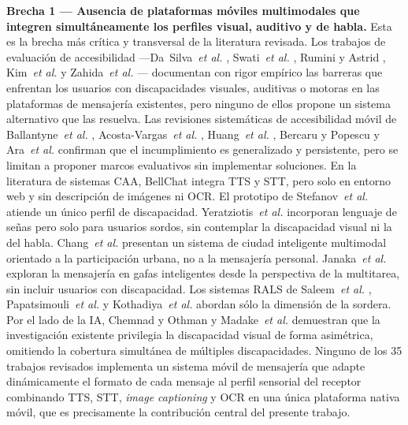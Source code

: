 \documentclass[journal]{IEEEtran}
\begin{document}
			\textbf{Brecha 1 --- Ausencia de plataformas m\'oviles multimodales que integren simult\'aneamente los perfiles visual, auditivo y de habla.} Esta es la brecha m\'as cr\'itica y transversal de la literatura revisada. Los trabajos de evaluaci\'on de accesibilidad ---Da~Silva~\textit{et al.} \cite{dasilva2016}, Swati~\textit{et al.} \cite{swati2021}, Rumini y Astrid \cite{rumini2019}, Kim~\textit{et al.} \cite{kim2024} y Zahida~\textit{et al.} \cite{zahida2021}--- documentan con rigor emp\'irico las barreras que enfrentan los usuarios con discapacidades visuales, auditivas o motoras en las plataformas de mensajer\'ia existentes, pero ninguno de ellos propone un sistema alternativo que las resuelva. Las revisiones sistem\'aticas de accesibilidad m\'ovil de Ballantyne~\textit{et al.} \cite{ballantyne2018}, Acosta-Vargas~\textit{et al.} \cite{acosta2021}, Huang~\textit{et al.} \cite{huang2025}, Bercaru y Popescu \cite{bercaru2024} y Ara~\textit{et al.} \cite{ara2024} confirman que el incumplimiento es generalizado y persistente, pero se limitan a proponer marcos evaluativos sin implementar soluciones. En la literatura de sistemas CAA, BellChat \cite{guerrero2021bellchat} integra TTS y STT, pero solo en entorno web y sin descripci\'on de im\'agenes ni OCR. El prototipo de Stefanov~\textit{et al.} \cite{stefanov2024} atiende un \'unico perfil de discapacidad. Yeratziotis~\textit{et al.} \cite{yeratziotis2023} incorporan lenguaje de se\~nas pero solo para usuarios sordos, sin contemplar la discapacidad visual ni la del habla. Chang~\textit{et al.} \cite{chang2022} presentan un sistema de ciudad inteligente multimodal orientado a la participaci\'on urbana, no a la mensajer\'ia personal. Janaka~\textit{et al.} \cite{janaka2023} exploran la mensajer\'ia en gafas inteligentes desde la perspectiva de la multitarea, sin incluir usuarios con discapacidad. Los sistemas RALS de Saleem~\textit{et al.} \cite{saleem2023}, Papatsimouli~\textit{et al.} \cite{papatsimouli2023} y Kothadiya~\textit{et al.} \cite{kothadiya2022} abordan s\'olo la dimensi\'on de la sordera. Por el lado de la IA, Chemnad y Othman \cite{chemnad2024} y Madake~\textit{et al.} \cite{madake2023} demuestran que la investigaci\'on existente privilegia la discapacidad visual de forma asim\'etrica, omitiendo la cobertura simult\'anea de m\'ultiples discapacidades. Ninguno de los 35 trabajos revisados implementa un sistema m\'ovil de mensajer\'ia que adapte din\'amicamente el formato de cada mensaje al perfil sensorial del receptor combinando TTS, STT, \textit{image captioning} y OCR en una \'unica plataforma nativa m\'ovil, que es precisamente la contribuci\'on central del presente trabajo.
			
\end{document}
